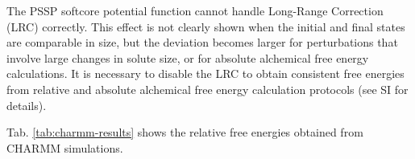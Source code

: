 \documentclass[journal=jctcce,manuscript=article]{achemso}
\begin{document}

The PSSP softcore potential function cannot handle Long-Range Correction (LRC) correctly. This effect is not clearly shown when the initial and final states are comparable in size, but the deviation becomes larger for perturbations that involve large changes in solute size, or for absolute alchemical free energy calculations. It is necessary to disable the LRC to obtain consistent free energies from relative and absolute alchemical free energy calculation protocols (see SI for details).

Tab. \ref{tab:charmm-results} shows the relative free energies obtained from CHARMM simulations.
\begin{table}[]
  \begin{minipage}{\linewidth}
  \caption{Comparing CHARMM results for simulations with various split protocols. Signs of the  backward
    transformation have been reverted to correspond to the forward
    transformation.}\label{tab:charmm-results}
\end{minipage}
\end{table}
\end{document}
